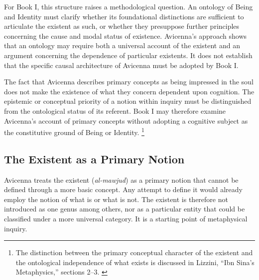 \label{para:VS.B01.P01.C08.S13.SS03.P004}

For Book I, this structure raises a
methodological question. An ontology
of Being and Identity must clarify
whether its foundational distinctions
are sufficient to articulate the
existent as such, or whether they
presuppose further principles concerning
the cause and modal status of existence.
Avicenna's approach shows that an
ontology may require both a universal
account of the existent and an argument
concerning the dependence of particular
existents. It does not establish that
the specific causal architecture of
Avicenna must be adopted by Book I.

\label{para:VS.B01.P01.C08.S13.SS03.P005}

The fact that Avicenna describes primary
concepts as being impressed in the soul
does not make the existence of what they
concern dependent upon cognition. The
epistemic or conceptual priority of a
notion within inquiry must be distinguished
from the ontological status of its
referent. Book I may therefore examine
Avicenna's account of primary concepts
without adopting a cognitive subject
as the constitutive ground of Being
or Identity.
\footnote{The distinction between the
primary conceptual character of the
existent and the ontological independence
of what exists is discussed in Lizzini,
``Ibn Sina's Metaphysics,'' sections 2--3.
\cite{LizziniIbnSinaMetaphysicsSEP2026}}



\subsection{The Existent as a Primary Notion}
\label{subsec:ch08-avicenna-existent-primary}

\label{para:VS.B01.P01.C08.S13.SS04.P001}

Avicenna treats the existent (\textit{al-mawjud})
as a primary notion that cannot be defined
through a more basic concept. Any attempt
to define it would already employ the
notion of what is or what is not. The
existent is therefore not introduced
as one genus among others, nor as a
particular entity that could be classified
under a more universal category. It is
a starting point of metaphysical inquiry.
\citep[Ilahiyyat, I.2 and I.5]{AvicennaMetaphysics}

